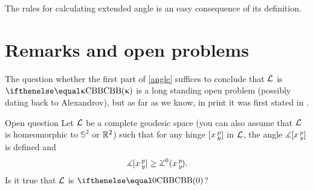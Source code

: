 The rules for calculating extended angle is an easy consequence of its definition.
\qeds


\section{Remarks and open problems}

The question whether the first part of \ref{angle} suffices to conclude that $\mathcal{L}$ is $\Alex\kappa$ is a long standing open problem (possibly dating back to Alexandrov),
but as far as we know, in print it was first stated in \cite[footnote in 4.1.5]{burago-burago-ivanov}.


\begin{thm}{Open question}\label{open:hinge-}
Let $\mathcal{L}$ be a complete geodesic space (you can also assume that $\mathcal{L}$ is homeomorphic to $\mathbb{S}^2$ or $\mathbb{R}^2$) 
such that for any hinge $[x\,{}^{p}_{y}]$ in $\mathcal{L}$, 
the angle $\measuredangle[x\,{}^{p}_{y}]$ is defined and 
\[\mangle\hinge x p y\ge\angk0 x p y.\]
Is it true that $\mathcal{L}$ is $\Alex{0}$?
\end{thm}









